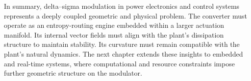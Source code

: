 In summary, delta–sigma modulation in power electronics and control systems represents a deeply coupled geometric and physical problem. The converter must operate as an entropy-routing engine embedded within a larger actuation manifold. Its internal vector fields must align with the plant’s dissipation structure to maintain stability. Its curvature must remain compatible with the plant’s natural dynamics. The next chapter extends these insights to embedded and real-time systems, where computational and resource constraints impose further geometric structure on the modulator.


